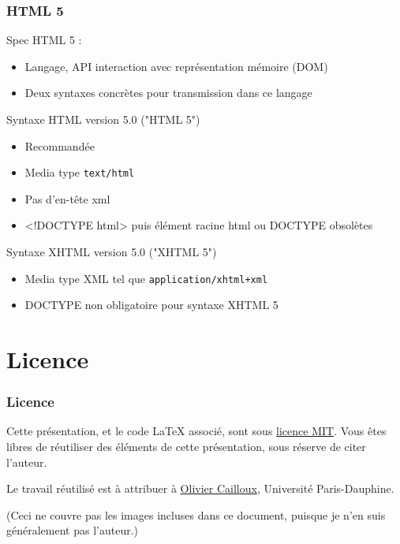 \documentclass[english, french]{beamer}
\begin{document}
\begin{frame}
	\frametitle{HTML 5}
	Spec HTML 5 : 
	\begin{itemize}
		\item Langage, API interaction avec représentation mémoire (DOM)
		\item Deux syntaxes concrètes pour transmission dans ce langage
	\end{itemize}
	\begin{block}{Syntaxe HTML version 5.0 ("HTML 5")}
		\begin{itemize}
			\item Recommandée
			\item Media type \texttt{text/html}
			\item Pas d’en-tête xml
			\item{} <!DOCTYPE html> puis élément racine html {\tiny ou DOCTYPE obsolètes}%
		\end{itemize}
	\end{block}
	\begin{block}{Syntaxe XHTML version 5.0 ("XHTML 5")}
		\begin{itemize}
			\item Media type XML tel que \texttt{application/xhtml+xml}
			\item DOCTYPE non obligatoire pour syntaxe XHTML 5
		\end{itemize}
	\end{block}
\end{frame}

\section{Licence}
\begin{frame}
	\frametitle{Licence}
	Cette présentation, et le code LaTeX associé, sont sous \href{http://opensource.org/licenses/MIT}{licence MIT}. Vous êtes libres de réutiliser des éléments de cette présentation, sous réserve de citer l’auteur.
	
	Le travail réutilisé est à attribuer à \href{http://www.lamsade.dauphine.fr/~ocailloux/}{Olivier Cailloux}, Université Paris-Dauphine.
	
	\small{(Ceci ne couvre pas les images incluses dans ce document, puisque je n’en suis généralement pas l’auteur.)}
\end{frame}
\end{document}
